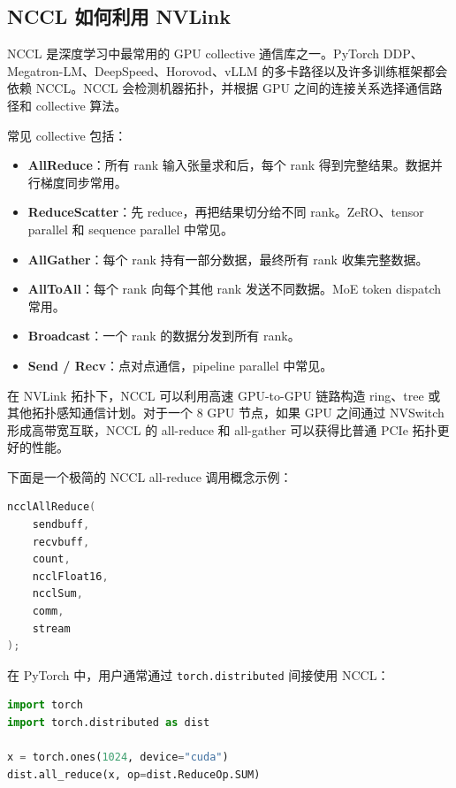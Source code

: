 \subsection{NCCL 如何利用 NVLink}
\label{subsec:nccl-nvlink}

NCCL 是深度学习中最常用的 GPU collective 通信库之一。PyTorch DDP、Megatron-LM、DeepSpeed、Horovod、vLLM 的多卡路径以及许多训练框架都会依赖 NCCL。NCCL 会检测机器拓扑，并根据 GPU 之间的连接关系选择通信路径和 collective 算法。

常见 collective 包括：

\begin{itemize}
  \item \textbf{AllReduce}：所有 rank 输入张量求和后，每个 rank 得到完整结果。数据并行梯度同步常用。
  \item \textbf{ReduceScatter}：先 reduce，再把结果切分给不同 rank。ZeRO、tensor parallel 和 sequence parallel 中常见。
  \item \textbf{AllGather}：每个 rank 持有一部分数据，最终所有 rank 收集完整数据。
  \item \textbf{AllToAll}：每个 rank 向每个其他 rank 发送不同数据。MoE token dispatch 常用。
  \item \textbf{Broadcast}：一个 rank 的数据分发到所有 rank。
  \item \textbf{Send / Recv}：点对点通信，pipeline parallel 中常见。
\end{itemize}

在 NVLink 拓扑下，NCCL 可以利用高速 GPU-to-GPU 链路构造 ring、tree 或其他拓扑感知通信计划。对于一个 8 GPU 节点，如果 GPU 之间通过 NVSwitch 形成高带宽互联，NCCL 的 all-reduce 和 all-gather 可以获得比普通 PCIe 拓扑更好的性能。

下面是一个极简的 NCCL all-reduce 调用概念示例：

\begin{lstlisting}[language=C++,caption={NCCL AllReduce 概念代码},label={lst:nccl-allreduce-concept}]
ncclAllReduce(
    sendbuff,
    recvbuff,
    count,
    ncclFloat16,
    ncclSum,
    comm,
    stream
);
\end{lstlisting}

在 PyTorch 中，用户通常通过 \texttt{torch.distributed} 间接使用 NCCL：

\begin{lstlisting}[language=Python,caption={PyTorch 中触发 NCCL AllReduce 的概念示例},label={lst:pytorch-allreduce}]
import torch
import torch.distributed as dist

x = torch.ones(1024, device="cuda")
dist.all_reduce(x, op=dist.ReduceOp.SUM)
\end{lstlisting}

